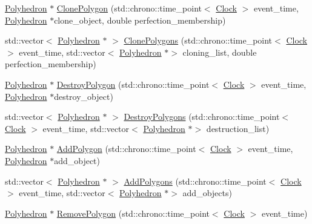 \begin{DoxyCompactItemize}
\item 
\hyperlink{class_polyhedron}{Polyhedron} $\ast$ \hyperlink{class_polyhedron_abfacad3a348785dab8819e70bf92d8d1}{Clone\+Polygon} (std\+::chrono\+::time\+\_\+point$<$ \hyperlink{universe_8h_a0ef8d951d1ca5ab3cfaf7ab4c7a6fd80}{Clock} $>$ event\+\_\+time, \hyperlink{class_polyhedron}{Polyhedron} $\ast$clone\+\_\+object, double perfection\+\_\+membership)
\item 
std\+::vector$<$ \hyperlink{class_polyhedron}{Polyhedron} $\ast$ $>$ \hyperlink{class_polyhedron_ab4f57da9595dc92de7340cc46237a2ea}{Clone\+Polygons} (std\+::chrono\+::time\+\_\+point$<$ \hyperlink{universe_8h_a0ef8d951d1ca5ab3cfaf7ab4c7a6fd80}{Clock} $>$ event\+\_\+time, std\+::vector$<$ \hyperlink{class_polyhedron}{Polyhedron} $\ast$$>$ cloning\+\_\+list, double perfection\+\_\+membership)
\item 
\hyperlink{class_polyhedron}{Polyhedron} $\ast$ \hyperlink{class_polyhedron_a2fcc5144ebc64363f40c31d2b980cfaf}{Destroy\+Polygon} (std\+::chrono\+::time\+\_\+point$<$ \hyperlink{universe_8h_a0ef8d951d1ca5ab3cfaf7ab4c7a6fd80}{Clock} $>$ event\+\_\+time, \hyperlink{class_polyhedron}{Polyhedron} $\ast$destroy\+\_\+object)
\item 
std\+::vector$<$ \hyperlink{class_polyhedron}{Polyhedron} $\ast$ $>$ \hyperlink{class_polyhedron_ae372d216765d48b9423ee37a8bf8b282}{Destroy\+Polygons} (std\+::chrono\+::time\+\_\+point$<$ \hyperlink{universe_8h_a0ef8d951d1ca5ab3cfaf7ab4c7a6fd80}{Clock} $>$ event\+\_\+time, std\+::vector$<$ \hyperlink{class_polyhedron}{Polyhedron} $\ast$$>$ destruction\+\_\+list)
\item 
\hyperlink{class_polyhedron}{Polyhedron} $\ast$ \hyperlink{class_polyhedron_a63bc509a87935cc25e541d2490c01d1f}{Add\+Polygon} (std\+::chrono\+::time\+\_\+point$<$ \hyperlink{universe_8h_a0ef8d951d1ca5ab3cfaf7ab4c7a6fd80}{Clock} $>$ event\+\_\+time, \hyperlink{class_polyhedron}{Polyhedron} $\ast$add\+\_\+object)
\item 
std\+::vector$<$ \hyperlink{class_polyhedron}{Polyhedron} $\ast$ $>$ \hyperlink{class_polyhedron_a9564a286e7323b56667971b851f0674a}{Add\+Polygons} (std\+::chrono\+::time\+\_\+point$<$ \hyperlink{universe_8h_a0ef8d951d1ca5ab3cfaf7ab4c7a6fd80}{Clock} $>$ event\+\_\+time, std\+::vector$<$ \hyperlink{class_polyhedron}{Polyhedron} $\ast$$>$ add\+\_\+objects)
\item 
\hyperlink{class_polyhedron}{Polyhedron} $\ast$ \hyperlink{class_polyhedron_a3b411fa617291a2a2d5df92b819285b4}{Remove\+Polygon} (std\+::chrono\+::time\+\_\+point$<$ \hyperlink{universe_8h_a0ef8d951d1ca5ab3cfaf7ab4c7a6fd80}{Clock} $>$ event\+\_\+time)
$$
\end{DoxyCompactItemize}
